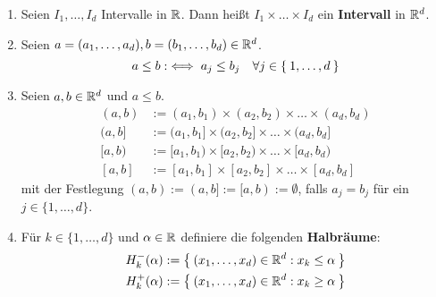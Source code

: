 \begin{definition}
    \begin{enumerate}
    \item Seien $I_1,\dots,I_d$ Intervalle in $\mathbb{R}$. 
          Dann heißt $I_1\times\dots\times I_d$ ein \textbf{Intervall} 
          in $\mathbb{R}^d$.
    \item Seien $a=(a_1,\dots,a_d), b=(b_1,\dots,b_d)\in\mathbb{R}^d$.
          \[a\le b:\iff a_j\le b_j \quad \forall j \in \Set{1, \dots, d}\]
    \item Seien $a,b\in\mathbb{R}^d$ und $a\le b$.
          \begin{align*}
            (a,b) &:= (a_1,b_1)\times(a_2,b_2)\times\dots\times(a_d,b_d)\\
            (a,b] &:= (a_1,b_1]\times(a_2,b_2]\times\dots\times(a_d,b_d]\\
            [a,b) &:= [a_1,b_1)\times[a_2,b_2)\times\dots\times[a_d,b_d)\\
            [a,b] &:= [a_1,b_1]\times[a_2,b_2]\times\dots\times[a_d,b_d]
        \end{align*}
        mit der Festlegung $(a,b):=(a,b]:=[a,b):=\emptyset$, falls 
        $a_j=b_j$ für ein $j\in\{1,\dots,d\}$.
    \item Für $k\in\{1,\dots,d\}$ und $\alpha\in\mathbb{R}$ definiere die 
          folgenden \textbf{Halbräume}:
          \begin{align*}
            H_k^-(\alpha) &:= \Set{(x_1,\dots,x_d)\in\ensuremath{\mathbb{R}}^d:x_k\le\alpha}\\
            H_k^+(\alpha) &:= \Set{(x_1,\dots,x_d)\in\ensuremath{\mathbb{R}}^d:x_k\ge\alpha}
          \end{align*}
    \end{enumerate}
\end{definition}

